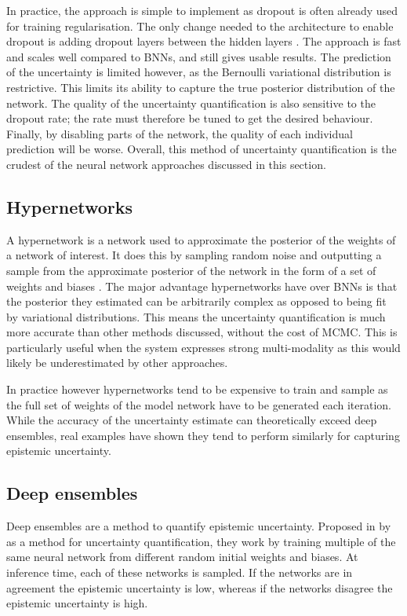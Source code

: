 In practice, the approach is simple to implement as dropout is often already used for training regularisation. The only
change needed to the architecture to enable dropout is adding dropout layers between the hidden layers
\parencite{wabinaNeuralStochasticDifferential2023}. The approach is fast and scales well compared to BNNs, and still
gives usable results. The prediction of the uncertainty is limited however, as the Bernoulli variational distribution is restrictive. This
limits its ability to capture the true posterior distribution of the network. The quality of the uncertainty
quantification is also sensitive to the dropout rate; the rate must therefore be tuned to get the desired behaviour.
Finally, by disabling parts of the network, the quality of each individual prediction will be worse. Overall, this
method of uncertainty quantification is the crudest of the neural network approaches discussed in this section.

\subsection{Hypernetworks}
\label{subsec:hypernetworks}
A hypernetwork is a network used to approximate the posterior of the weights of a network of interest. It does this by
sampling random noise and outputting a sample from the approximate posterior of the network in the form of a set of
weights and biases \parencite{kruegerBayesianHypernetworks2017}. The major advantage hypernetworks have over BNNs is
that the posterior they estimated can be arbitrarily complex as opposed to being fit by variational distributions. This
means the uncertainty quantification is much more accurate than other methods discussed, without the cost of MCMC. This
is particularly useful when the system expresses strong multi-modality as this would likely be underestimated by other
approaches.

In practice however hypernetworks tend to be expensive to train and sample as the full set of weights of the model
network have to be generated each iteration. While the accuracy of the uncertainty estimate can theoretically exceed
deep ensembles, real examples have shown they tend to perform similarly for capturing epistemic uncertainty.

\subsection{Deep ensembles}
\label{subsec:deep_ensembles}
Deep ensembles are a method to quantify epistemic uncertainty. Proposed in
\citeyear{lakshminarayananSimpleScalablePredictive2017} by
\citeauthor{lakshminarayananSimpleScalablePredictive2017} as a method for uncertainty quantification, they work by training multiple of the same neural network
from different random initial weights and biases. At inference time, each of these networks is sampled. If the networks are in
agreement the epistemic uncertainty is low, whereas if the networks disagree the epistemic uncertainty is high. 

